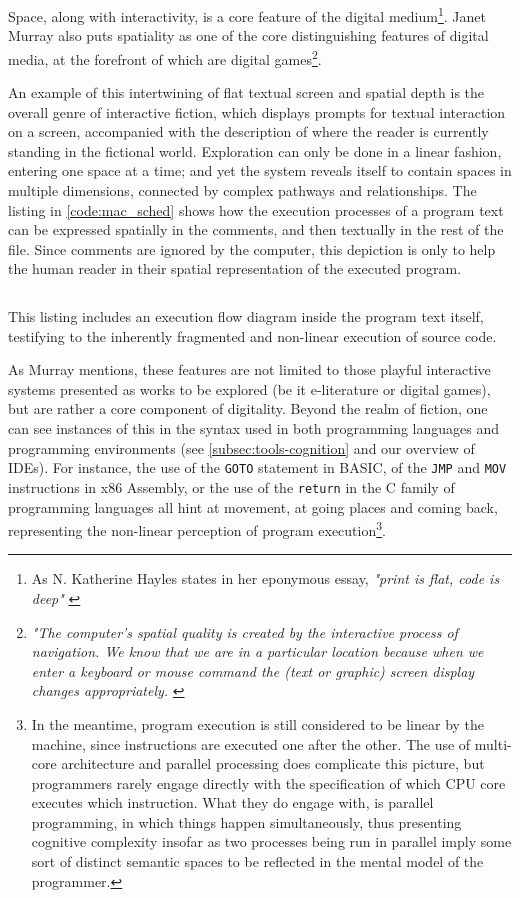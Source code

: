Space, along with interactivity, is a core feature of the digital medium\footnote{As N. Katherine Hayles states in her eponymous essay, \emph{"print is flat, code is deep"} \citep{hayles_print_2004}}. Janet Murray also puts spatiality as one of the core distinguishing features of digital media, at the forefront of which are digital games\footnote{\emph{"The computer's spatial quality is created by the interactive process of navigation. We know that we are in a particular location because when we enter a keyboard or mouse command the (text or graphic) screen display changes appropriately.} \citep{murray_hamlet_1998}}.

An example of this intertwining of flat textual screen and spatial depth is the overall genre of interactive fiction, which displays prompts for textual interaction on a screen, accompanied with the description of where the reader is currently standing in the fictional world. Exploration can only be done in a linear fashion, entering one space at a time; and yet the system reveals itself to contain spaces in multiple dimensions, connected by complex pathways and relationships. The listing in \ref{code:mac_sched} shows how the execution processes of a program text can be expressed spatially in the comments, and then textually in the rest of the file. Since comments are ignored by the computer, this depiction is only to help the human reader in their spatial representation of the executed program.

\begin{listing}
    \inputminted[]{c}{./corpus/mac_sched.c}
    \caption{This listing includes an execution flow diagram inside the program text itself, testifying to the inherently fragmented and non-linear execution of source code. \citep{mustacchi_mac_2019}}
    \label{code:mac_sched}
\end{listing}

As Murray mentions, these features are not limited to those playful interactive systems presented as works to be explored (be it e-literature or digital games), but are rather a core component of digitality. Beyond the realm of fiction, one can see instances of this in the syntax used in both programming languages and programming environments (see \ref{subsec:tools-cognition} and our overview of IDEs). For instance, the use of the \lstinline{GOTO} statement in BASIC, of the \lstinline{JMP} and \lstinline{MOV} instructions in x86 Assembly, or the use of the \lstinline{return} in the C family of programming languages all hint at movement, at going places and coming back, representing the non-linear perception of program execution\footnote{In the meantime, program execution is still considered to be linear by the machine, since instructions are executed one after the other. The use of multi-core architecture and parallel processing does complicate this picture, but programmers rarely engage directly with the specification of which CPU core executes which instruction. What they do engage with, is parallel programming, in which things happen simultaneously, thus presenting cognitive complexity insofar as two processes being run in parallel imply some sort of distinct semantic spaces to be reflected in the mental model of the programmer.}.

